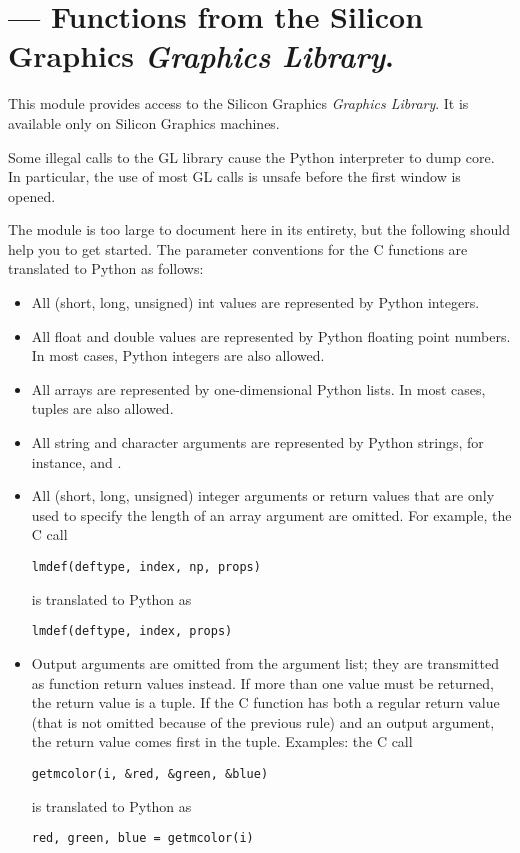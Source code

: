 \section{ ---
         Functions from the Silicon Graphics \emph{Graphics Library}.}



This module provides access to the Silicon Graphics
\emph{Graphics Library}.
It is available only on Silicon Graphics machines.

Some illegal calls to the GL library cause the Python interpreter to dump
core.
In particular, the use of most GL calls is unsafe before the first
window is opened.

The module is too large to document here in its entirety, but the
following should help you to get started.
The parameter conventions for the C functions are translated to Python as
follows:

\begin{itemize}
\item
All (short, long, unsigned) int values are represented by Python
integers.
\item
All float and double values are represented by Python floating point
numbers.
In most cases, Python integers are also allowed.
\item
All arrays are represented by one-dimensional Python lists.
In most cases, tuples are also allowed.
\item
\begin{sloppypar}
All string and character arguments are represented by Python strings,
for instance,
and
.
\end{sloppypar}
\item
All (short, long, unsigned) integer arguments or return values that are
only used to specify the length of an array argument are omitted.
For example, the C call

\begin{verbatim}
lmdef(deftype, index, np, props)
\end{verbatim}
%
is translated to Python as

\begin{verbatim}
lmdef(deftype, index, props)
\end{verbatim}
%
\item
Output arguments are omitted from the argument list; they are
transmitted as function return values instead.
If more than one value must be returned, the return value is a tuple.
If the C function has both a regular return value (that is not omitted
because of the previous rule) and an output argument, the return value
comes first in the tuple.
Examples: the C call

\begin{verbatim}
getmcolor(i, &red, &green, &blue)
\end{verbatim}
%
is translated to Python as

\begin{verbatim}
red, green, blue = getmcolor(i)
\end{verbatim}
%
\end{itemize}

